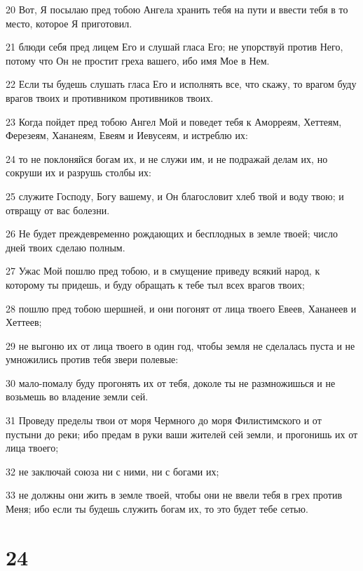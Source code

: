 \par 20 Вот, Я посылаю пред тобою Ангела хранить тебя на пути и ввести тебя в то место, которое Я приготовил.
\par 21 блюди себя пред лицем Его и слушай гласа Его; не упорствуй против Него, потому что Он не простит греха вашего, ибо имя Мое в Нем.
\par 22 Если ты будешь слушать гласа Его и исполнять все, что скажу, то врагом буду врагов твоих и противником противников твоих.
\par 23 Когда пойдет пред тобою Ангел Мой и поведет тебя к Аморреям, Хеттеям, Ферезеям, Хананеям, Евеям и Иевусеям, и истреблю их:
\par 24 то не поклоняйся богам их, и не служи им, и не подражай делам их, но сокруши их и разрушь столбы их:
\par 25 служите Господу, Богу вашему, и Он благословит хлеб твой и воду твою; и отвращу от вас болезни.
\par 26 Не будет преждевременно рождающих и бесплодных в земле твоей; число дней твоих сделаю полным.
\par 27 Ужас Мой пошлю пред тобою, и в смущение приведу всякий народ, к которому ты придешь, и буду обращать к тебе тыл всех врагов твоих;
\par 28 пошлю пред тобою шершней, и они погонят от лица твоего Евеев, Хананеев и Хеттеев;
\par 29 не выгоню их от лица твоего в один год, чтобы земля не сделалась пуста и не умножились против тебя звери полевые:
\par 30 мало-помалу буду прогонять их от тебя, доколе ты не размножишься и не возьмешь во владение земли сей.
\par 31 Проведу пределы твои от моря Чермного до моря Филистимского и от пустыни до реки; ибо предам в руки ваши жителей сей земли, и прогонишь их от лица твоего;
\par 32 не заключай союза ни с ними, ни с богами их;
\par 33 не должны они жить в земле твоей, чтобы они не ввели тебя в грех против Меня; ибо если ты будешь служить богам их, то это будет тебе сетью.

\chapter{24}

